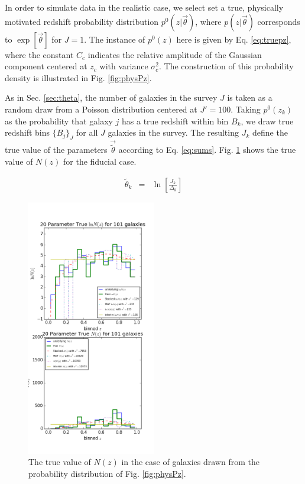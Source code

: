 \documentclass[preprint]{aastex}
\begin{document}
In order to simulate data in the realistic case, we select set a true, physically motivated redshift probability distribution $p^{0}(z|\vec{\theta})$, where $p(z|\vec{\theta})$ corresponds to $\exp[\vec{\theta}]$ for $J=1$.  The instance of $p^{0}(z)$ here is given by Eq. \ref{eq:truepz}, where the constant $C_{c}$ indicates the relative amplitude of the Gaussian component centered at $z_{c}$ with variance $\sigma_{c}^{2}$.  %
The construction of this probability density is illustrated in Fig. \ref{fig:physPz}. 

As in Sec. \ref{sec:theta}, the number of galaxies in the survey $J$ is taken as a random draw from a Poisson distribution centered at $J'=100$.  Taking $p^{0}(z_{k})$ as the probability that galaxy $j$ has a true redshift within bin $B_{k}$, we draw true redshift bins $\{B_{j}\}_{J}$ for all $J$ galaxies in the survey.  The resulting $J_{k}$ define the true value of the parameters $\vec{\tilde{\theta}}$ according to Eq. \ref{eq:sums}.   Fig. \ref{fig:nulltrueNz} shows the true value of $N(z)$ for the fiducial case.

\begin{eqnarray}
\label{eq:sums}
\tilde{\theta}_{k} &=& \ln\left[\frac{J_{k}}{\Delta_{k}}\right]
\end{eqnarray}

\begin{figure}
\includegraphics[width=0.5\textwidth]{null/trueNz.png}
\caption{The true value of $N(z)$ in the case of galaxies drawn from the probability distribution of Fig. \ref{fig:physPz}.}
\label{fig:nulltrueNz}
\end{figure}
\end{document}
